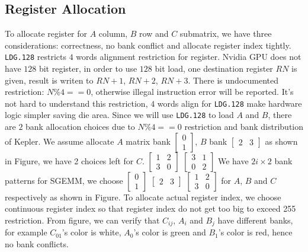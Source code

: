 \subsection{Register Allocation}

To allocate register for $A$ column, $B$ row and $C$ submatrix, we have three considerations: correctness, no bank
conflict and allocate register index tightly.
{\tt LDG.128} restricts $4$ words alignment restriction for register.
Nvidia GPU does not have $128$ bit register, in order to use $128$ bit load, one destination register $RN$ is given, result is writen to
$RN+1$, $RN+2$, $RN+3$. There is undocumented restriction: $N\%4==0$, otherwise illegal instruction error will be reported.
It's not hard to understand this restriction, $4$ words align for {\tt LDG.128} make hardware logic simpler saving die area.
Since we will use {\tt LDG.128} to load $A$ and $B$, there are $2$ bank allocation choices due to $N\%4==0$ restriction and
bank distribution of Kepler. We assume allocate $A$ matrix bank $\begin{bmatrix} 0 \\ 1  \end{bmatrix}$,
$B$ bank $\begin{bmatrix} 2 & 3 \end{bmatrix}$ as shown in Figure, we have 2 choices left for $C$.
$\begin{bmatrix} 1 & 2 \\ 3 & 0  \end{bmatrix}$
$\begin{bmatrix} 3 & 1 \\ 0 & 2  \end{bmatrix}$
We have $2i\times2$ bank patterns for SGEMM, we choose $\begin{bmatrix} 0 \\ 1  \end{bmatrix}$ $\begin{bmatrix} 2 & 3 \end{bmatrix}$
$\begin{bmatrix} 1 & 2 \\ 3 & 0  \end{bmatrix}$ for $A$, $B$ and $C$ respectively as shown in Figure.
To allocate actual register index, we choose continuous register index so that register index do not get too big to
exceed 255 restriction. From figure, we can verify that $C_{ij}$, $A_i$ and $B_j$ have different banks, for example
$C_{01}$'s color is white, $A_0$'s color is green and $B_1$'s color is red, hence no bank conflicts.

